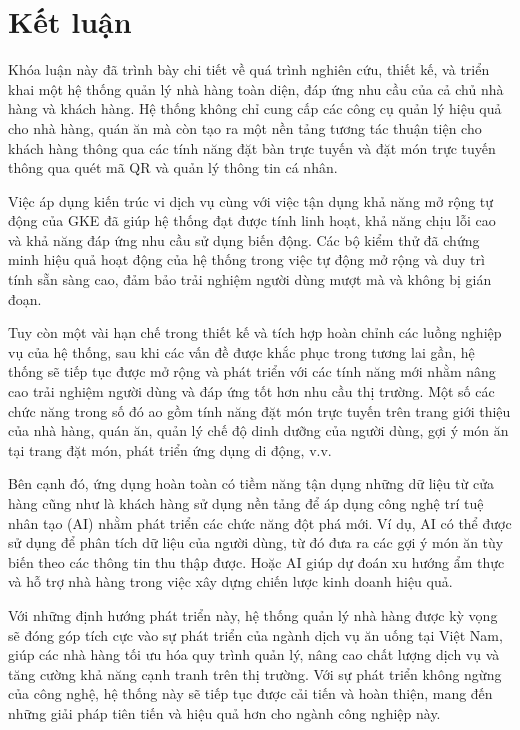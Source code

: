 \chapter*{Kết luận}\label{chap5}
Khóa luận này đã trình bày chi tiết về quá trình nghiên cứu, thiết kế, và triển khai một hệ thống quản lý nhà hàng toàn diện, đáp ứng nhu cầu của cả chủ nhà hàng và khách hàng.
Hệ thống không chỉ cung cấp các công cụ quản lý hiệu quả cho nhà hàng, quán ăn mà còn tạo ra một nền tảng tương tác thuận tiện cho khách hàng thông qua các tính năng đặt bàn trực tuyến và đặt món trực tuyến thông qua quét mã QR và quản lý thông tin cá nhân.

Việc áp dụng kiến trúc vi dịch vụ cùng với việc tận dụng khả năng mở rộng tự động của GKE đã giúp hệ thống đạt được tính linh hoạt, khả năng chịu lỗi cao và khả năng đáp ứng nhu cầu sử dụng biến động. Các bộ kiểm thử đã chứng minh hiệu quả hoạt động của hệ thống trong việc tự động mở rộng và duy trì tính sẵn sàng cao, đảm bảo trải nghiệm người dùng mượt mà và không bị gián đoạn.

Tuy còn một vài hạn chế trong thiết kế và tích hợp hoàn chỉnh các luồng nghiệp vụ của hệ thống, sau khi các vấn đề được khắc phục trong tương lai gần, hệ thống sẽ tiếp tục được mở rộng và phát triển với các tính năng mới nhằm nâng cao trải nghiệm người dùng và đáp ứng tốt hơn nhu cầu thị trường.
Một số các chức năng trong số đó ao gồm tính năng đặt món trực tuyến trên trang giới thiệu của nhà hàng, quán ăn, quản lý chế độ dinh dưỡng của người dùng, gợi ý món ăn tại trang đặt món, phát triển ứng dụng di động, v.v.

Bên cạnh đó, ứng dụng hoàn toàn có tiềm năng tận dụng những dữ liệu từ cửa hàng cũng như là khách hàng sử dụng nền tảng để áp dụng công nghệ trí tuệ nhân tạo (AI) nhằm phát triển các chức năng đột phá mới.
Ví dụ, AI có thể được sử dụng để phân tích dữ liệu của người dùng, từ đó đưa ra các gợi ý món ăn tùy biến theo các thông tin thu thập được.
Hoặc AI giúp dự đoán xu hướng ẩm thực và hỗ trợ nhà hàng trong việc xây dựng chiến lược kinh doanh hiệu quả.

Với những định hướng phát triển này, hệ thống quản lý nhà hàng được kỳ vọng sẽ đóng góp tích cực vào sự phát triển của ngành dịch vụ ăn uống tại Việt Nam, giúp các nhà hàng tối ưu hóa quy trình quản lý, nâng cao chất lượng dịch vụ và tăng cường khả năng cạnh tranh trên thị trường.
Với sự phát triển không ngừng của công nghệ, hệ thống này sẽ tiếp tục được cải tiến và hoàn thiện, mang đến những giải pháp tiên tiến và hiệu quả hơn cho ngành công nghiệp này.